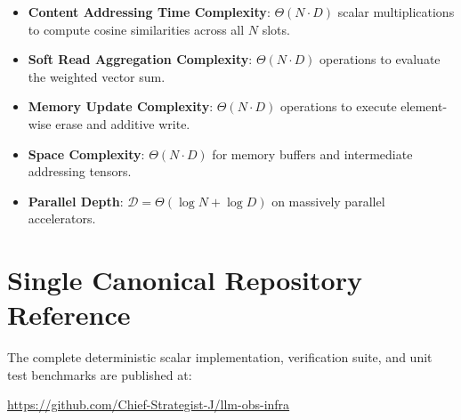 \documentclass[11pt,a4paper]{article}
\theoremstyle{definition}
\begin{document}
\begin{itemize}
    \item \textbf{Content Addressing Time Complexity}: $\Theta(N \cdot D)$ scalar multiplications to compute cosine similarities across all $N$ slots.
    \item \textbf{Soft Read Aggregation Complexity}: $\Theta(N \cdot D)$ operations to evaluate the weighted vector sum.
    \item \textbf{Memory Update Complexity}: $\Theta(N \cdot D)$ operations to execute element-wise erase and additive write.
    \item \textbf{Space Complexity}: $\Theta(N \cdot D)$ for memory buffers and intermediate addressing tensors.
    \item \textbf{Parallel Depth}: $\mathcal{D} = \Theta(\log N + \log D)$ on massively parallel accelerators.
\end{itemize}

\section{Single Canonical Repository Reference}

The complete deterministic scalar implementation, verification suite, and unit test benchmarks are published at:
\begin{center}
\url{https://github.com/Chief-Strategist-J/llm-obs-infra}
\end{center}
\end{document}
